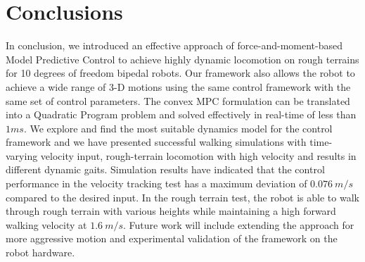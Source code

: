 

\section{Conclusions}
\label{sec:Conclusion}
In conclusion, we introduced an effective approach of force-and-moment-based Model Predictive Control to achieve highly dynamic locomotion on rough terrains for 10 degrees of freedom bipedal robots. Our framework also allows the robot to achieve a wide range of 3-D motions using the same control framework with the same set of control parameters. 
The convex MPC formulation can be translated into a Quadratic Program problem and solved effectively in real-time of less than $1 \unit{ms}$. 
We explore and find the most suitable dynamics model for the control framework and we have presented successful walking simulations with time-varying velocity input, rough-terrain locomotion with high velocity and results in different dynamic gaits. Simulation results have indicated that the control performance in the velocity tracking test has a maximum deviation of $0.076\: \unit{m/s} $ compared to the desired input. In the rough terrain test, the robot is able to walk through rough terrain with various heights while maintaining a high forward walking velocity at $1.6\:\unit{m/s}$. 
Future work will include extending the approach for more aggressive motion and experimental validation of the framework on the robot hardware.

